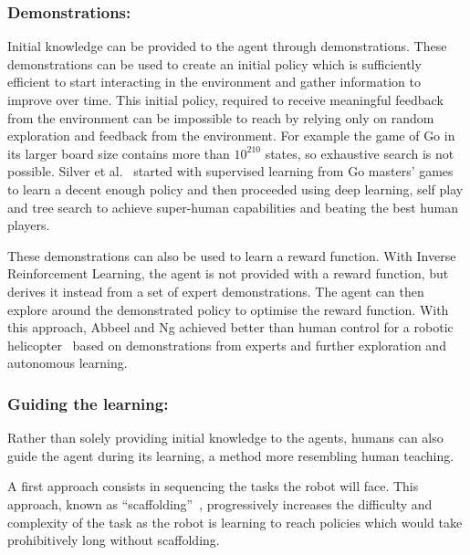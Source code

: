 \documentclass[letterpaper]{article} %
\begin{document}
\subsubsection{Demonstrations:} 

Initial knowledge can be provided to the agent through demonstrations. These
demonstrations can be used to create an initial policy which is sufficiently
efficient to start interacting in the environment and gather information to
improve over time. This initial policy, required to receive meaningful feedback
from the environment can be impossible to reach by relying only on random
exploration and feedback from the environment. For example the game of Go in its
larger board size contains more than $10^{210}$ states, so exhaustive search is
not possible.  Silver et al.~\cite{silver2016mastering} started with supervised
learning from Go masters' games to learn a decent enough policy and then
proceeded using deep learning, self play and tree search to achieve super-human
capabilities and beating the best human players.

These demonstrations can also be used to learn a reward function. With Inverse
Reinforcement Learning, the agent is not provided with a reward function, but
derives it instead from a set of expert demonstrations. The agent can then
explore around the demonstrated policy to optimise the reward function. With
this approach, Abbeel and Ng achieved better than human control for a robotic
helicopter~\cite{abbeel2004apprenticeship} based on demonstrations from experts
and further exploration and autonomous learning.

\subsubsection{Guiding the learning:}

Rather than solely providing initial knowledge to the agents, humans can also
guide the agent during its learning, a method more resembling human teaching. 

A first approach consists in sequencing the tasks the robot will face.  This
approach, known as ``scaffolding''~\cite{saunders2006teaching}, progressively
increases the difficulty and complexity of the task as the robot is learning to
reach policies which would take prohibitively long without scaffolding.
\end{document}
